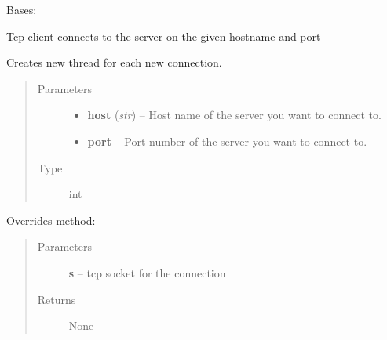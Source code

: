 \documentclass[letterpaper,10pt,english]{sphinxmanual}
\begin{document}
\begin{fulllineitems}
\label{libraries:libraries.ethernet.Client}
Bases: {\hyperref[libraries:libraries.ethernet._TcpConnection]{}}

Tcp client connects to the server on the given hostname and port

Creates new thread for each new connection.
\begin{quote}\begin{description}
\item[{Parameters}] \leavevmode\begin{itemize}
\item {} 
\textbf{host} (\emph{str}) -- Host name of the server you want to connect to.

\item {} 
\textbf{port} -- Port number of the server you want to connect to.

\end{itemize}

\item[{Type}] \leavevmode
int

\end{description}\end{quote}

\begin{fulllineitems}
\label{libraries:libraries.ethernet.Client._connection}
Overrides method: {\hyperref[libraries:libraries.ethernet._TcpConnection._connection]{}}
\begin{quote}\begin{description}
\item[{Parameters}] \leavevmode
\textbf{s} -- tcp socket for the connection

\item[{Returns}] \leavevmode
None

\end{description}\end{quote}

\end{fulllineitems}


\end{fulllineitems}

\end{document}
